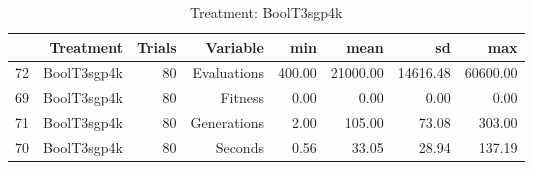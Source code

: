 \begin{table}[ht]
\centering
\begin{tabular}{rrrrrrrr}
  \hline
 & Treatment & Trials & Variable & min & mean & sd & max \\ 
  \hline
72 & BoolT3sgp4k &  80 & Evaluations & 400.00 & 21000.00 & 14616.48 & 60600.00 \\ 
  69 & BoolT3sgp4k &  80 & Fitness & 0.00 & 0.00 & 0.00 & 0.00 \\ 
  71 & BoolT3sgp4k &  80 & Generations & 2.00 & 105.00 & 73.08 & 303.00 \\ 
  70 & BoolT3sgp4k &  80 & Seconds & 0.56 & 33.05 & 28.94 & 137.19 \\ 
   \hline
\end{tabular}
\caption{Treatment: BoolT3sgp4k} 
\end{table}
